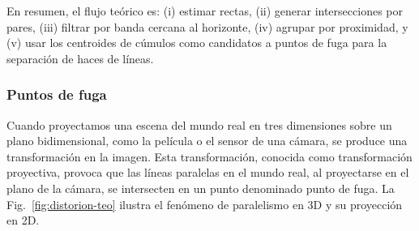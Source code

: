\noindent
En resumen, el flujo teórico es: (i) estimar rectas, (ii) generar intersecciones por pares, (iii) filtrar por banda cercana al horizonte,
(iv) agrupar por proximidad, y (v) usar los centroides de cúmulos como candidatos a puntos de fuga para la separación de haces de líneas.

\subsubsection{Puntos de fuga}\label{sec:vanishing-points}
\noindent
Cuando proyectamos una escena del mundo real en tres dimensiones sobre un plano bidimensional, 
como la película o el sensor de una cámara, se produce una transformación en la imagen.
Esta transformación, conocida como transformación proyectiva, provoca que las líneas paralelas en el mundo real,
 al proyectarse en el plano de la cámara, se intersecten en un punto denominado punto de fuga.
  La Fig.~\ref{fig:distorion-teo} ilustra el fenómeno de paralelismo en 3D y su proyección en 2D.


